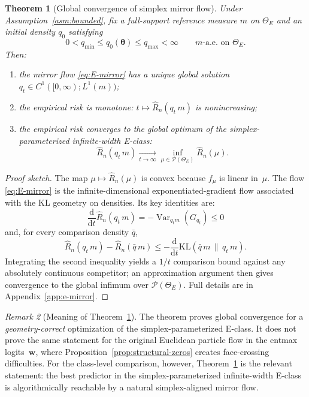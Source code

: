 \documentclass[11pt,a4paper]{article}
\newtheorem{theorem}{Theorem}[section]
\theoremstyle{definition}
\theoremstyle{remark}
\newtheorem{remark}[theorem]{Remark}
\newcommand{\vtheta}{\boldsymbol{\theta}}
\newcommand{\vw}{\mathbf{w}}
\newcommand{\dd}{\mathrm{d}}
\begin{document}
\begin{theorem}[Global convergence of simplex mirror flow]
  \label{thm:E-global}
  Under Assumption~\ref{asm:bounded}, fix a
  full-support reference measure \(m\) on
  \(\Theta_E\) and an initial density \(q_0\)
  satisfying
  \[
    0 < q_{\min} \le q_0(\vtheta) \le q_{\max}
    < \infty
    \qquad
    \text{$m$-a.e. on \(\Theta_E\).}
  \]
  Then:
  \begin{enumerate}[label=(\alph*),leftmargin=*]
    \item the mirror flow \eqref{eq:E-mirror}
    has a unique global solution
    \(q_t \in C^1([0,\infty);L^1(m))\);
    \item the empirical risk is monotone:
    \(t \mapsto \hat R_n(q_t\,m)\) is
    nonincreasing;
    \item the empirical risk converges to the
    global optimum of the simplex-parameterized
    infinite-width E-class:
    \[
      \hat R_n(q_t\,m)
      \xrightarrow[t\to\infty]{}
      \inf_{\mu \in \mathcal{P}(\Theta_E)}
      \hat R_n(\mu).
    \]
  \end{enumerate}
\end{theorem}

\begin{proof}[Proof sketch]
  The map \(\mu \mapsto \hat R_n(\mu)\) is convex
  because \(f_\mu\) is linear in~\(\mu\).
  The flow \eqref{eq:E-mirror} is the
  infinite-dimensional exponentiated-gradient
  flow associated with the KL geometry on
  densities.
  Its key identities are:
  \[
    \frac{\dd}{\dd t}\hat R_n(q_t\,m)
    =
    -\operatorname{Var}_{q_t m}(G_{q_t})
    \le 0
  \]
  and, for every comparison density \(\bar q\),
  \[
    \hat R_n(q_t\,m) - \hat R_n(\bar q\,m)
    \le
    -\frac{\dd}{\dd t}
    \mathrm{KL}(\bar q\,m \,\|\, q_t\,m).
  \]
  Integrating the second inequality yields a
  \(1/t\) comparison bound against any
  absolutely continuous competitor; an
  approximation argument then gives convergence
  to the global infimum over
  \(\mathcal{P}(\Theta_E)\).
  Full details are in
  Appendix~\ref{app:e-mirror}.
\end{proof}

\begin{remark}[Meaning of Theorem~\ref{thm:E-global}]
  The theorem proves global convergence for a
  \emph{geometry-correct} optimization of the
  simplex-parameterized E-class.
  It does not prove the same statement for the
  original Euclidean particle flow in the
  entmax logits~\(\vw\), where
  Proposition~\ref{prop:structural-zeros}
  creates face-crossing difficulties.
  For the class-level comparison, however,
  Theorem~\ref{thm:E-global} is the relevant
  statement: the best predictor in the
  simplex-parameterized infinite-width E-class is
  algorithmically reachable by a natural
  simplex-aligned mirror flow.
\end{remark}
\end{document}
